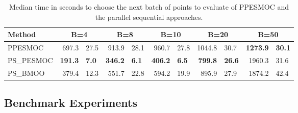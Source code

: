 \begin{table}
\centering
\caption{Median time in seconds to choose the next batch of points to evaluate of PPESMOC and the parallel sequential approaches.}
\label{table:pesmoc_times}
\begin{tabular}{lr@{$\pm$}lr@{$\pm$}lr@{$\pm$}lr@{$\pm$}lr@{$\pm$}l}
\hline
\bf{Method} & \multicolumn{2}{c}{B=4} & \multicolumn{2}{c}{B=8} & \multicolumn{2}{c}{B=10} & \multicolumn{2}{c}{B=20} & \multicolumn{2}{c}{B=50}\\
\hline
PPESMOC & 697.3 & 27.5 & 913.9 & 28.1 & 960.7 & 27.8 & 1044.8 & 30.7 & \bf{1273.9} & \bf{30.1} \\
PS\_PESMOC & \bf{191.3} & \bf{7.0} & \bf{346.2} & \bf{6.1} & \bf{406.2} & \bf{6.5} & \bf{799.8} & \bf{26.6} & 1960.3 & 31.6 \\
PS\_BMOO & 379.4 & 12.3 & 551.7 & 22.8 & 594.2 & 19.9 & 895.9 & 27.9 & 1874.2 & 42.4 \\
\hline
\end{tabular}
\end{table}



\subsection{Benchmark Experiments}

